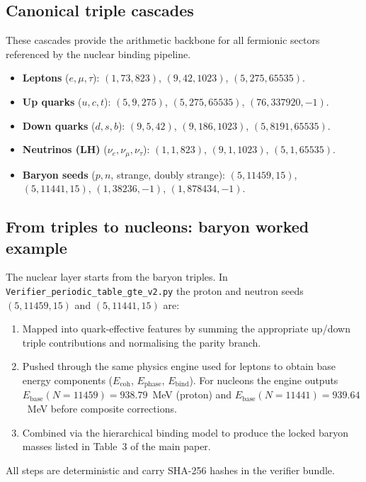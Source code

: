 \documentclass[9pt,twocolumn]{extarticle}
\begin{document}
\subsection{Canonical triple cascades}
These cascades provide the arithmetic backbone for all fermionic sectors referenced by the nuclear binding pipeline.

\begin{itemize}[leftmargin=1.2em,itemsep=0.2em]
  \item \textbf{Leptons} ($e,\mu,\tau$): $(1,73,823)$, $(9,42,1023)$, $(5,275,65535)$.
  \item \textbf{Up quarks} ($u,c,t$): $(5,9,275)$, $(5,275,65535)$, $(76,337920,-1)$.
  \item \textbf{Down quarks} ($d,s,b$): $(9,5,42)$, $(9,186,1023)$, $(5,8191,65535)$.
  \item \textbf{Neutrinos (LH)} ($\nu_e,\nu_\mu,\nu_\tau$): $(1,1,823)$, $(9,1,1023)$, $(5,1,65535)$.
  \item \textbf{Baryon seeds} ($p,n$, strange, doubly strange): $(5,11459,15)$, $(5,11441,15)$, $(1,38236,-1)$, $(1,878434,-1)$.
\end{itemize}

\subsection{From triples to nucleons: baryon worked example}
The nuclear layer starts from the baryon triples. In \texttt{Verifier\_periodic\_table\_gte\_v2.py} the proton and neutron seeds $(5,11459,15)$ and $(5,11441,15)$ are:
\begin{enumerate}[leftmargin=1.4em,itemsep=0.2em]
  \item Mapped into quark-effective features by summing the appropriate up/down triple contributions and normalising the parity branch.
  \item Pushed through the same physics engine used for leptons to obtain base energy components ($E_{\text{coh}}$, $E_{\text{phase}}$, $E_{\text{bind}}$). For nucleons the engine outputs $E_{\text{base}}(N{=}11459) = 938.79$~MeV (proton) and $E_{\text{base}}(N{=}11441) = 939.64$~MeV before composite corrections.
  \item Combined via the hierarchical binding model to produce the locked baryon masses listed in Table~3 of the main paper.
\end{enumerate}
All steps are deterministic and carry SHA-256 hashes in the verifier bundle.
\end{document}
